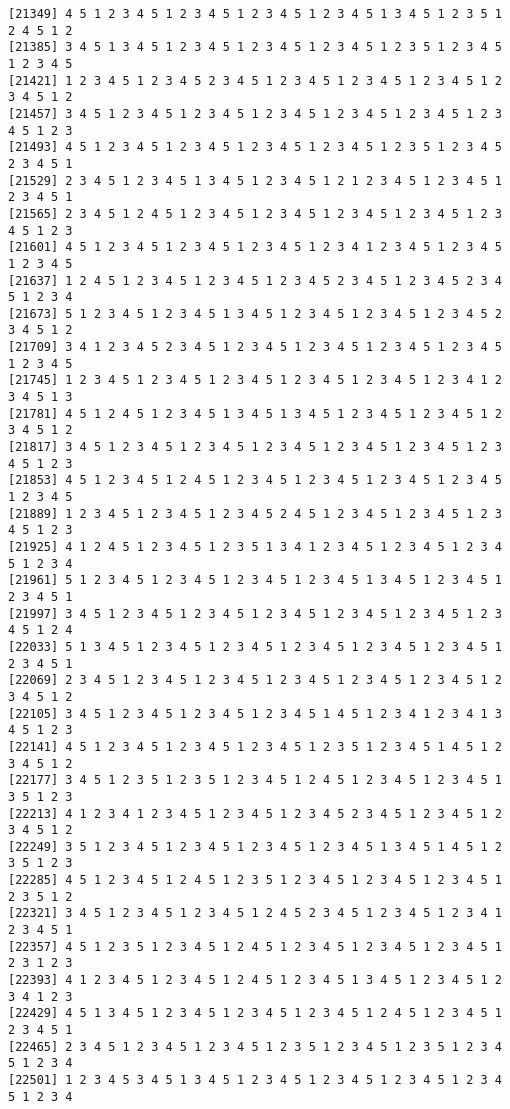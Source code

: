\documentclass[
  11pt,
]{book}
\begin{document}
\begin{verbatim}
[21349] 4 5 1 2 3 4 5 1 2 3 4 5 1 2 3 4 5 1 2 3 4 5 1 3 4 5 1 2 3 5 1 2 4 5 1 2
[21385] 3 4 5 1 3 4 5 1 2 3 4 5 1 2 3 4 5 1 2 3 4 5 1 2 3 5 1 2 3 4 5 1 2 3 4 5
[21421] 1 2 3 4 5 1 2 3 4 5 2 3 4 5 1 2 3 4 5 1 2 3 4 5 1 2 3 4 5 1 2 3 4 5 1 2
[21457] 3 4 5 1 2 3 4 5 1 2 3 4 5 1 2 3 4 5 1 2 3 4 5 1 2 3 4 5 1 2 3 4 5 1 2 3
[21493] 4 5 1 2 3 4 5 1 2 3 4 5 1 2 3 4 5 1 2 3 4 5 1 2 3 5 1 2 3 4 5 2 3 4 5 1
[21529] 2 3 4 5 1 2 3 4 5 1 3 4 5 1 2 3 4 5 1 2 1 2 3 4 5 1 2 3 4 5 1 2 3 4 5 1
[21565] 2 3 4 5 1 2 4 5 1 2 3 4 5 1 2 3 4 5 1 2 3 4 5 1 2 3 4 5 1 2 3 4 5 1 2 3
[21601] 4 5 1 2 3 4 5 1 2 3 4 5 1 2 3 4 5 1 2 3 4 1 2 3 4 5 1 2 3 4 5 1 2 3 4 5
[21637] 1 2 4 5 1 2 3 4 5 1 2 3 4 5 1 2 3 4 5 2 3 4 5 1 2 3 4 5 2 3 4 5 1 2 3 4
[21673] 5 1 2 3 4 5 1 2 3 4 5 1 3 4 5 1 2 3 4 5 1 2 3 4 5 1 2 3 4 5 2 3 4 5 1 2
[21709] 3 4 1 2 3 4 5 2 3 4 5 1 2 3 4 5 1 2 3 4 5 1 2 3 4 5 1 2 3 4 5 1 2 3 4 5
[21745] 1 2 3 4 5 1 2 3 4 5 1 2 3 4 5 1 2 3 4 5 1 2 3 4 5 1 2 3 4 1 2 3 4 5 1 3
[21781] 4 5 1 2 4 5 1 2 3 4 5 1 3 4 5 1 3 4 5 1 2 3 4 5 1 2 3 4 5 1 2 3 4 5 1 2
[21817] 3 4 5 1 2 3 4 5 1 2 3 4 5 1 2 3 4 5 1 2 3 4 5 1 2 3 4 5 1 2 3 4 5 1 2 3
[21853] 4 5 1 2 3 4 5 1 2 4 5 1 2 3 4 5 1 2 3 4 5 1 2 3 4 5 1 2 3 4 5 1 2 3 4 5
[21889] 1 2 3 4 5 1 2 3 4 5 1 2 3 4 5 2 4 5 1 2 3 4 5 1 2 3 4 5 1 2 3 4 5 1 2 3
[21925] 4 1 2 4 5 1 2 3 4 5 1 2 3 5 1 3 4 1 2 3 4 5 1 2 3 4 5 1 2 3 4 5 1 2 3 4
[21961] 5 1 2 3 4 5 1 2 3 4 5 1 2 3 4 5 1 2 3 4 5 1 3 4 5 1 2 3 4 5 1 2 3 4 5 1
[21997] 3 4 5 1 2 3 4 5 1 2 3 4 5 1 2 3 4 5 1 2 3 4 5 1 2 3 4 5 1 2 3 4 5 1 2 4
[22033] 5 1 3 4 5 1 2 3 4 5 1 2 3 4 5 1 2 3 4 5 1 2 3 4 5 1 2 3 4 5 1 2 3 4 5 1
[22069] 2 3 4 5 1 2 3 4 5 1 2 3 4 5 1 2 3 4 5 1 2 3 4 5 1 2 3 4 5 1 2 3 4 5 1 2
[22105] 3 4 5 1 2 3 4 5 1 2 3 4 5 1 2 3 4 5 1 4 5 1 2 3 4 1 2 3 4 1 3 4 5 1 2 3
[22141] 4 5 1 2 3 4 5 1 2 3 4 5 1 2 3 4 5 1 2 3 5 1 2 3 4 5 1 4 5 1 2 3 4 5 1 2
[22177] 3 4 5 1 2 3 5 1 2 3 5 1 2 3 4 5 1 2 4 5 1 2 3 4 5 1 2 3 4 5 1 3 5 1 2 3
[22213] 4 1 2 3 4 1 2 3 4 5 1 2 3 4 5 1 2 3 4 5 2 3 4 5 1 2 3 4 5 1 2 3 4 5 1 2
[22249] 3 5 1 2 3 4 5 1 2 3 4 5 1 2 3 4 5 1 2 3 4 5 1 3 4 5 1 4 5 1 2 3 5 1 2 3
[22285] 4 5 1 2 3 4 5 1 2 4 5 1 2 3 5 1 2 3 4 5 1 2 3 4 5 1 2 3 4 5 1 2 3 5 1 2
[22321] 3 4 5 1 2 3 4 5 1 2 3 4 5 1 2 4 5 2 3 4 5 1 2 3 4 5 1 2 3 4 1 2 3 4 5 1
[22357] 4 5 1 2 3 5 1 2 3 4 5 1 2 4 5 1 2 3 4 5 1 2 3 4 5 1 2 3 4 5 1 2 3 1 2 3
[22393] 4 1 2 3 4 5 1 2 3 4 5 1 2 4 5 1 2 3 4 5 1 3 4 5 1 2 3 4 5 1 2 3 4 1 2 3
[22429] 4 5 1 3 4 5 1 2 3 4 5 1 2 3 4 5 1 2 3 4 5 1 2 4 5 1 2 3 4 5 1 2 3 4 5 1
[22465] 2 3 4 5 1 2 3 4 5 1 2 3 4 5 1 2 3 5 1 2 3 4 5 1 2 3 5 1 2 3 4 5 1 2 3 4
[22501] 1 2 3 4 5 3 4 5 1 3 4 5 1 2 3 4 5 1 2 3 4 5 1 2 3 4 5 1 2 3 4 5 1 2 3 4

\end{verbatim}
\end{document}
